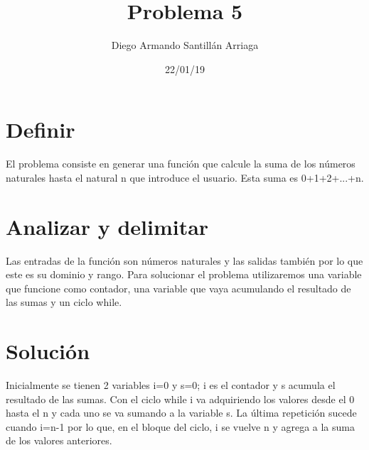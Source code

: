 \documentclass[letterpaper, 12pt, oneside]{article}%
\title{\Huge Problema 5}
\author{Diego Armando Santillán Arriaga}
\date{22/01/19}
\begin{document}
\maketitle
\newpage
\section*{Definir}
El problema consiste en generar una función que calcule la suma de los números naturales hasta el natural n que introduce el usuario. Esta suma es 0+1+2+...+n. 
\section*{Analizar y delimitar}
Las entradas de la función son números naturales y las salidas también por lo que este es su dominio y rango. Para solucionar el problema utilizaremos una variable que funcione como contador, una variable que vaya acumulando el resultado de las sumas y un ciclo while.  
\section*{Solución}
Inicialmente se tienen 2 variables i=0 y s=0; i es el contador y s acumula el resultado de las sumas. Con el ciclo while i va adquiriendo los valores desde el 0 hasta el n y cada uno se va sumando a la variable s. La última repetición sucede cuando i=n-1 por lo que, en el bloque del ciclo, i se vuelve n y agrega a la suma de los valores anteriores. 
\end{document}
